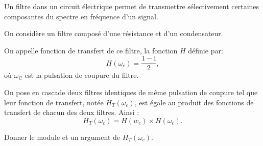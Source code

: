 \medskip

Un filtre dans un circuit électrique permet de transmettre sélectivement certaines composantes du spectre en fréquence d'un signal.

On considère un filtre composé d'une résistance et d'un condensateur.

On appelle fonction de transfert de ce filtre, la fonction $H$ définie par: 
\[H\left(\omega_c\right) = \dfrac{1 - \text{i}}{2},\]
où $\omega_{\text{C}}$ est la pulsation de coupure du filtre.

On pose en cascade deux filtres identiques de même pulsation de coupure tel que leur fonction de transfert, notée $H_T\left(\omega_c\right)$, est égale au produit des fonctions de transfert de chacun des deux filtres. Ainsi :
\[H_T\left(\omega_c\right) = H\left(w_c\right) \times H\left(\omega_c\right).\]

Donner le module et un argument de $H_T\left(\omega_c\right)$.
